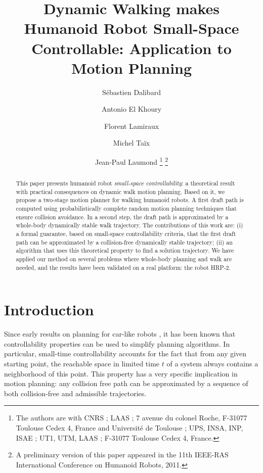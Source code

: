 \documentclass{article}
\begin{document}
\title{Dynamic Walking makes Humanoid Robot Small-Space Controllable: Application to Motion Planning}

\author{
S\'ebastien Dalibard\and
Antonio El Khoury\and
Florent Lamiraux\and
Michel Ta\"ix\and
Jean-Paul Laumond
\footnote{The authors are with CNRS ; LAAS ; 7 avenue du colonel Roche, F-31077
  Toulouse Cedex 4, France and Universit\'e de Toulouse ; UPS, INSA, INP, ISAE ; UT1, UTM, LAAS ; F-31077 Toulouse
  Cedex 4, France.}
\footnote{A preliminary version of this paper appeared in the 11th 
  IEEE-RAS International Conference on Humanoid Robots, 2011.}
}

 


\maketitle


\begin{abstract}
  This paper presents humanoid robot  \textit{small-space controllability}: 
  a theoretical result with practical
  consequences on dynamic walk motion planning.
  Based on it, we propose 
  a  two-stage motion planner for walking humanoid
  robots.  A first draft path is computed using probabilistically complete
  random motion planning  techniques that  ensure collision avoidance.  
  In a  second step, the
  draft path  is approximated by a whole-body  dynamically stable walk
  trajectory.   The  contributions  of  this  work are:  (i)  a  formal
  guarantee,  based on small-space  controllability criteria,  that the
  first draft path can be approximated by a collision-free dynamically
  stable  trajectory; (ii)  an  algorithm that  uses this  theoretical
  property to find  a solution trajectory. We have  applied our method
  on several  problems where whole-body planning and  walk are needed,
  and the results have been validated  on a real  platform: the robot
  HRP-2.
\end{abstract}


\section{Introduction}

Since early results on planning for car-like robots \cite{taix-94}, it has been known that 
controllability properties can be used to simplify planning algorithms. In particular,
small-time controllability accounts for the fact that from any given starting point,
the reachable space in limited time $t$ of a system always contains a neighborhood 
of this point. This property has a very specific implication in motion planning:
any collision free path can be approximated  by  a sequence  of  both  
collision-free and  admissible trajectories. 
\end{document}
